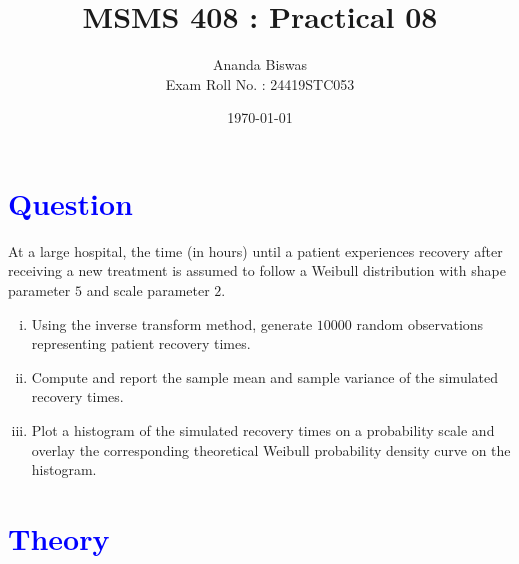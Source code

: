 \documentclass[11pt, a4paper]{article}\usepackage[]{graphicx}\usepackage[]{xcolor}
\title{MSMS 408 : Practical 08}
\author{Ananda Biswas \\[1em] Exam Roll No. : 24419STC053}
\date{\today}
\begin{document}
\maketitle


\section*{\faArrowAltCircleRight[regular] \textcolor{blue}{Question}}

\hspace{1cm} At a large hospital, the time (in hours) until a patient experiences recovery after receiving a new treatment is assumed to follow a Weibull distribution with shape parameter $5$ and scale parameter $2$.

\begin{enumerate}[(i)]
\item Using the inverse transform method, generate $10000$ random observations representing patient recovery times.

\item Compute and report the sample mean and sample variance of the simulated recovery times.

\item Plot a histogram of the simulated recovery times on a probability scale and overlay the corresponding theoretical Weibull probability density curve on the histogram.
\end{enumerate}

\section*{\faArrowAltCircleRight[regular] \textcolor{blue}{Theory}}
\end{document}
